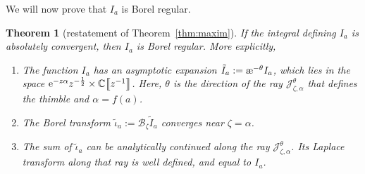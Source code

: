 \documentclass[pdftex]{sigma}
\newcommand{\C}{\mathbb{C}}
\newcommand{\series}[1]{\tilde{#1}}
\newcommand{\borel}{\mathcal{B}}
\newcommand{\aexp}{\text{\rm \ae}}
\numberwithin{equation}{section}
\newtheorem{Theorem}{Theorem}[section]
\begin{document}
We will now prove that $I_a$ is Borel regular.
\begin{Theorem}[restatement of Theorem~\ref{thm:maxim}]\label{thm:maxim-proof}
If the integral defining $I_a$ is absolutely convergent, then $I_a$ is Borel regular. More explicitly,
\begin{enumerate}\itemsep=0pt
\item[$(1)$] %
The function $I_a$ has an asymptotic expansion $\series{I}_a := \aexp^{-\theta} I_a$, which lies in the space ${\rm e}^{-z \alpha} z^{-\frac{1}{2}}\allowbreak\times \C\big\llbracket z^{-1}\big\rrbracket$. Here, $\theta$ is the direction of the ray $\mathcal{J}^\theta_{\zeta, \alpha}$ that defines the thimble and $\alpha=f(a)$.
\item[$(2)$] %
The Borel transform $\series{\iota}_a := \borel_\zeta \series{I}_a$ converges near $\zeta = \alpha$.
\item[$(3)$] %
The sum of $\series{\iota}_a$ can be analytically continued along the ray $\mathcal{J}_{\zeta, \alpha}^\theta$. Its Laplace transform along that ray is well defined, and equal to $I_a$.
\end{enumerate}
\end{Theorem}
\end{document}

